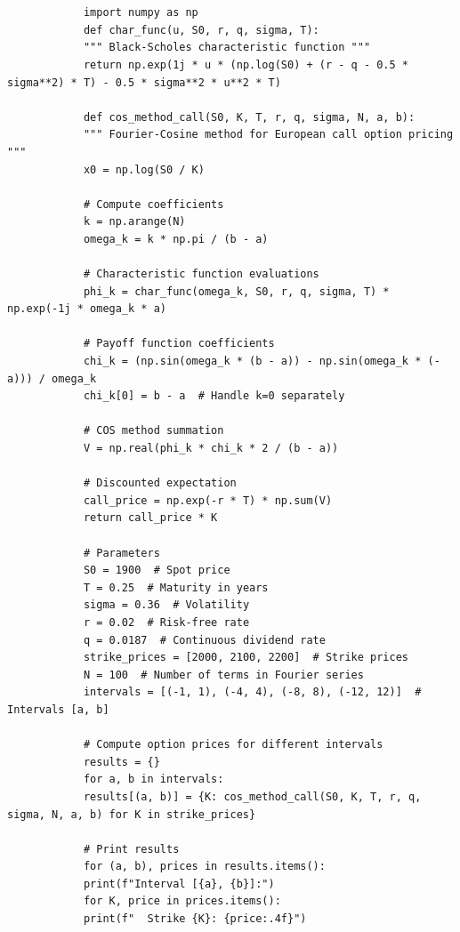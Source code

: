 \documentclass[letterpaper]{article}
\begin{document}
		 \begin{lstlisting}
		
   	    
   	        import numpy as np
   	        def char_func(u, S0, r, q, sigma, T):
   	        """ Black-Scholes characteristic function """
   	        return np.exp(1j * u * (np.log(S0) + (r - q - 0.5 * sigma**2) * T) - 0.5 * sigma**2 * u**2 * T)
   	        
   	        def cos_method_call(S0, K, T, r, q, sigma, N, a, b):
   	        """ Fourier-Cosine method for European call option pricing """
   	        x0 = np.log(S0 / K)
   	        
   	        # Compute coefficients
   	        k = np.arange(N)
   	        omega_k = k * np.pi / (b - a)
   	        
   	        # Characteristic function evaluations
   	        phi_k = char_func(omega_k, S0, r, q, sigma, T) * np.exp(-1j * omega_k * a)
   	        
   	        # Payoff function coefficients
   	        chi_k = (np.sin(omega_k * (b - a)) - np.sin(omega_k * (-a))) / omega_k
   	        chi_k[0] = b - a  # Handle k=0 separately
   	        
   	        # COS method summation
   	        V = np.real(phi_k * chi_k * 2 / (b - a))
   	        
   	        # Discounted expectation
   	        call_price = np.exp(-r * T) * np.sum(V)
   	        return call_price * K
   	        
   	        # Parameters
   	        S0 = 1900  # Spot price
   	        T = 0.25  # Maturity in years
   	        sigma = 0.36  # Volatility
   	        r = 0.02  # Risk-free rate
   	        q = 0.0187  # Continuous dividend rate
   	        strike_prices = [2000, 2100, 2200]  # Strike prices
   	        N = 100  # Number of terms in Fourier series
   	        intervals = [(-1, 1), (-4, 4), (-8, 8), (-12, 12)]  # Intervals [a, b]
   	        
   	        # Compute option prices for different intervals
   	        results = {}
   	        for a, b in intervals:
   	        results[(a, b)] = {K: cos_method_call(S0, K, T, r, q, sigma, N, a, b) for K in strike_prices}
   	        
   	        # Print results
   	        for (a, b), prices in results.items():
   	        print(f"Interval [{a}, {b}]:")
   	        for K, price in prices.items():
   	        print(f"  Strike {K}: {price:.4f}")
   	    
   \end{lstlisting}
		
    
	
\end{document}
